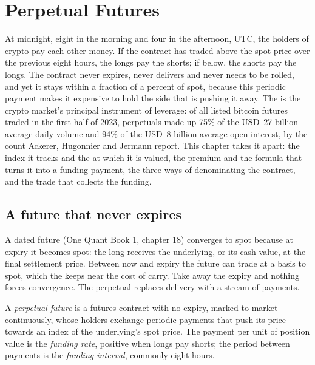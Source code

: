 \chapter{Perpetual Futures}\label{ch:m3:perpetual-futures}

At midnight, eight in the morning and four in the afternoon, UTC, the holders of crypto  pay
each other money. If the contract has traded above the spot price over the previous eight
hours, the longs pay the shorts; if below, the shorts pay the longs. The contract never expires, never
delivers and never needs to be rolled, and yet it stays within a fraction of a percent of spot, because
this periodic payment makes it expensive to hold the side that is pushing it away. The 
is the crypto market's principal instrument of leverage: of all listed bitcoin futures traded in the first half of 2023,
perpetuals made up 75\% of the USD~27 billion average daily volume and 94\% of the USD~8 billion average open
interest, by the count Ackerer, Hugonnier and Jermann report. This chapter takes it apart:
the index it tracks and the  at which it is valued, the premium and the formula that turns it
into a funding payment, the three ways of denominating the contract, and the trade that collects the
funding.

\section{A future that never expires}

A dated future (One Quant Book 1, chapter 18) converges to spot because at expiry it becomes spot: the
long receives the underlying, or its cash value, at the final settlement price. Between now and expiry
the future can trade at a basis to spot, which the  keeps near the cost of carry.
Take away the expiry and nothing forces convergence. The perpetual replaces delivery with a stream of
payments.

\begin{definition}\label{def:m3:perpetual-futures:perp}
A \emph{perpetual future} is a futures contract with no expiry, marked to market
continuously, whose holders exchange periodic payments that push its price towards an index of the
underlying's spot price. The payment per unit of position value is the \emph{funding
rate}, positive when longs pay shorts; the period between payments is the
\emph{funding interval}, commonly eight hours.
\end{definition}

